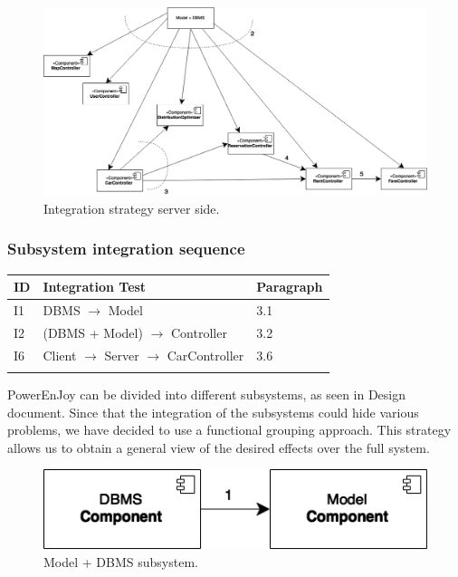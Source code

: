 \begin{figure}[hp]
\centering
\includegraphics[width=470 pt]{resources/integrationServer.png}
\caption{\label{fig:IntServer}Integration strategy server side.}
\end{figure}


\subsubsection{Subsystem integration sequence}
\begin{center}
\begin{tabular*}
{\textwidth}
{l p{8.5cm} l}
\hline
\textbf{ID} & \textbf{Integration Test} & \textbf{Paragraph} \\
\hline
I1 & DBMS $\rightarrow$ Model & 3.1\\
I2 & (DBMS + Model) $\rightarrow$ Controller & 3.2\\
I6 & Client $\rightarrow$ Server $\rightarrow$ CarController & 3.6\\
\hline
\newline
\newline
\end{tabular*}
\end{center}

PowerEnJoy can be divided into different subsystems, as seen in Design document.
Since that the integration of the subsystems could hide various problems, we have decided to use a functional grouping approach. This strategy allows us to obtain a general view of the desired effects over the full system.

\begin{figure}[hp]
\centering
\includegraphics[width=150 pt]{resources/Model_+_DBMS.png}
\caption{\label{fig:Model+DBMS}Model + DBMS subsystem.}
\end{figure}

